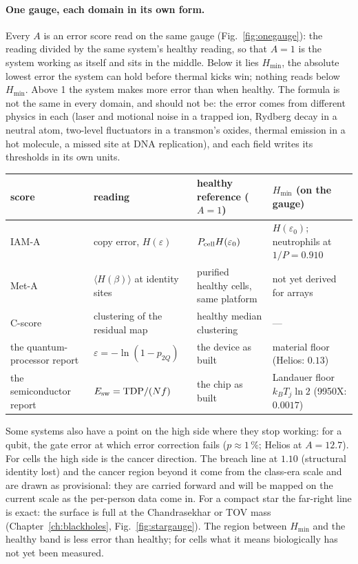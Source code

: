 \paragraph{One gauge, each domain in its own form.} Every $A$ is an error score read on the same gauge (Fig.~\ref{fig:onegauge}): the reading
divided by the same system's healthy reading, so that $A=1$ is the system working as itself and sits in the middle. Below it lies $H_{\min}$, the
absolute lowest error the system can hold before thermal kicks win; nothing reads below $H_{\min}$. Above 1 the system makes more error than when
healthy. The formula is not the same in every domain, and should not be: the error comes from different physics in each (laser and motional noise in a
trapped ion, Rydberg decay in a neutral atom, two-level fluctuators in a transmon's oxides, thermal emission in a hot molecule, a missed site at DNA
replication), and each field writes its thresholds in its own units.
\begin{center}\small\begin{tabular}{p{}p{}p{}p{}}\toprule
score & reading & healthy reference ($A=1$) & $H_{\min}$ (on the gauge)\\\midrule
IAM-A & copy error, $H(\varepsilon)$ & $P_{\rm cell}H(\varepsilon_0)$ & $H(\varepsilon_0)$; neutrophils at $1/P=0.910$\\
Met-A & $\langle H(\beta)\rangle$ at identity sites & purified healthy cells, same platform & not yet derived for arrays\\
C-score & clustering of the residual map & healthy median clustering & ---\\
the quantum-processor report & $\varepsilon=-\ln(1-p_{2Q})$ & the device as built & material floor (Helios: $0.13$)\\
the semiconductor report & $E_{\rm sw}=\mathrm{TDP}/(Nf)$ & the chip as built & Landauer floor $k_BT_j\ln2$ (9950X: $0.0017$)\\\bottomrule
\end{tabular}\end{center}
Some systems also have a point on the high side where they stop working: for a qubit, the gate error at which error correction fails ($p\approx1\,\%$;
Helios at $A=12.7$). For cells the high side is the cancer direction. The breach line at $1.10$ (structural identity lost) and the cancer region beyond it come from the
class-era scale and are drawn as provisional: they are carried forward and will be mapped on the current scale as the per-person data come in. For a compact star the far-right line is exact: the surface is full at the Chandrasekhar or TOV mass (Chapter~\ref{ch:blackholes}, Fig.~\ref{fig:stargauge}). The region between $H_{\min}$ and the healthy
band is less error than healthy; for cells what it means biologically has not yet been measured.

